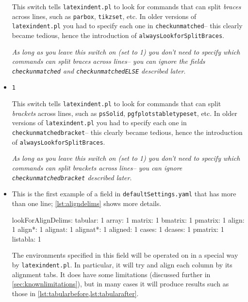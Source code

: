 \begin{itemize}
	This switch tells \lstinline!latexindent.pl! to look for commands that 
	can split \emph{braces} across lines, such as \lstinline!parbox!, \lstinline!tikzset!, etc. In older
	versions of \lstinline!latexindent.pl! you had to specify each one in \lstinline!checkunmatched!-- this 
	clearly became tedious, hence the introduction of \lstinline!alwaysLookforSplitBraces!. 
													 		 		 		 		 					
	\emph{As long as you leave this switch on (set to 1) you don't need to specify which 
		commands can split braces across lines-- you can ignore the 
		fields \lstinline!checkunmatched! and \lstinline!checkunmatchedELSE! described later}.
	\item[\verbitem{alwaysLookforSplitBrackets}] \lstinline!1!
													 		 		 		 		 					
	This switch tells \lstinline!latexindent.pl! to look for commands that 
	can split \emph{brackets} across lines, such as \lstinline!psSolid!, \lstinline!pgfplotstabletypeset!, 
	etc. In older versions of \lstinline!latexindent.pl! you had to specify each one in \lstinline!checkunmatchedbracket!-- 
	this clearly became tedious, hence the introduction of \lstinline!alwaysLookforSplitBraces!. 
													 		 		 		 		 					
	\emph{As long as you leave this switch on (set to 1) you don't need to specify which 
		commands can split brackets across lines-- you can ignore \lstinline!checkunmatchedbracket! described later}.
													 		 		 		 		 					
	\item[\verbitem{lookForAlignDelims}] This is the first example of a field
	in \lstinline!defaultSettings.yaml! that has more than one line; \cref{lst:aligndelims}
	shows more details.
													 		 		 		 		 					
	\begin{yaml}[caption={\lstinline!lookForAlignDelims!},label={lst:aligndelims}]
lookForAlignDelims:
   tabular: 1
   array: 1
   matrix: 1
   bmatrix: 1
   pmatrix: 1
   align: 1
   align*: 1
   alignat: 1
   alignat*: 1
   aligned: 1
   cases: 1
   dcases: 1
   pmatrix: 1
   listabla: 1
	\end{yaml}
													 		 		 		 		 					
	The environments specified in this field will be operated on in a special way  by \lstinline!latexindent.pl!. In particular, it will try and align each column by its alignment
	tabs. It does have some limitations (discussed further in \cref{sec:knownlimitations}), 
	but in many cases it will produce results such as those in \cref{lst:tabularbefore,lst:tabularafter}. 
													 		 		 		 		 					

\end{itemize}
